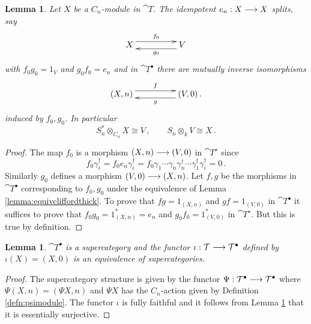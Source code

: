 \documentclass[english,letter paper,12pt,leqno]{article}
\newtheorem{lemma}[theorem]{Lemma}
\theoremstyle{example}
\newtheorem{remark}[theorem]{Remark}
\numberwithin{equation}{section}
\def\be{\begin{equation}}
\def\ee{\end{equation}}
\def\ferm{\gamma}
\def\fermc{\gamma^\dagger}
\begin{document}
\begin{lemma}\label{lemma:whackamole} Let $X$ be a $C_n$-module in $\cat{T}$. The idempotent $e_n: X \longrightarrow X$ splits, say 
\[
\xymatrix@C+2pc{
X \ar@<1ex>[r]^-{f_0} & V \ar@<1ex>[l]^-{g_0}
}
\]
with $f_0 g_0 = 1_V$ and $g_0 f_0 = e_n$ and in $\cat{T}^\bullet$ there are mutually inverse isomorphisms
\[
\xymatrix@C+2pc{
(X, n) \ar@<1ex>[r]^-{f} & (V,0) \ar@<1ex>[l]^-{g}\,.
}
\]
induced by $f_0,g_0$. In particular
\be
S_n^* \otimes_{C_n} X \cong V\,, \qquad S_n \otimes_k V \cong X\,.
\ee
\end{lemma}
\begin{proof}
The map $f_0$ is a morphism $(X,n) \longrightarrow (V,0)$ in $\cat{T}^{\star}$ since
\[
f_0 \fermc_i = f_0 e_n \fermc_i = f_0 \ferm_1 \cdots \ferm_n \fermc_n \cdots \fermc_1 \fermc_i = 0\,.
\]
Similarly $g_0$ defines a morphism $(V,0) \longrightarrow (X,n)$. Let $f,g$ be the morphisms in $\cat{T}^\bullet$ corresponding to $f_0,g_0$ under the equivalence of Lemma \ref{lemma:equivcliffordthick}. To prove that $fg = 1_{(X,n)}$ and $gf = 1_{(V,0)}$ in $\cat{T}^{\bullet}$ it suffices to prove that $f_0 g_0 = 1^*_{(X,n)} = e_n$ and $g_0 f_0 = 1^*_{(V,0)}$ in $\cat{T}^{\star}$. But this is true by definition.
\end{proof}

\begin{lemma}\label{lemma:embedcliffordthick} $\cat{T}^\bullet$ is a supercategory and the functor $\iota: \mathcal{T} \longrightarrow \mathcal{T}^\bullet$ defined by $\iota(X) = (X,0)$ is an equivalence of supercategories.
\end{lemma}
\begin{proof}
The supercategory structure is given by the functor $\Psi: \mathcal{T}^\bullet \longrightarrow \mathcal{T}^\bullet$ where $\Psi(X,n) = ( \Psi X, n )$ and $\Psi X$ has the $C_n$-action given by Definition \ref{defn:psimodule}. The functor $\iota$ is fully faithful and it follows from Lemma \ref{lemma:whackamole} that it is essentially surjective.
\end{proof}

\end{document}
